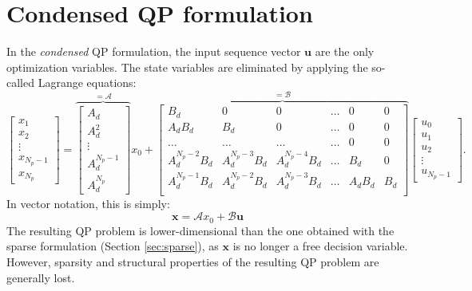 \documentclass[a4paper,12pt,fleqn]{article}
\newcommand{\varxvec}{\mathbf{x}}
\newcommand{\varuvec}{\mathbf{u}}
\newcommand{\Np}{{N_p}}
\begin{document}
\section{Condensed QP formulation}
In the \emph{condensed} QP formulation, the input sequence vector $\varuvec$ are the only optimization variables. The state variables are eliminated by applying the so-called Lagrange equations:
\begin{equation}
\begin{bmatrix}
x_1\\
x_2\\
\vdots\\
x_{\Np-1}\\
x_{\Np}
\end{bmatrix}=
\overbrace{
\begin{bmatrix}
A_d\\
A_d^2\\
\vdots\\
A_d^{\Np-1}\\
A_d^\Np
\end{bmatrix}
}^{=\mathcal{A}}
x_0 + 
\overbrace{
\begin{bmatrix}
 B_d                &0              &0              &\dots      &0      &0\\
 A_dB_d               &B_d            &0              &\dots      &0      &0\\
 \dots              &\dots          &\dots          &\dots     &0       &0\\
 A_d^{\Np-2}B_d       &A_d^{\Np-3}B_d   &A_d^{\Np-4}B_d   &\dots     &B_d       &0\\
 A_d^{\Np-1}B_d       &A_d^{\Np-2}B_d   &A_d^{\Np-3}B_d   &\dots     &A_dB_d      &B_d \\
\end{bmatrix}
}^{=\mathcal B}
\begin{bmatrix}
u_0\\
u_1\\
u_2\\
\vdots\\
u_{\Np-1}
\end{bmatrix}.
\end{equation}
In vector notation, this is simply:
\begin{equation}
 \varxvec = \mathcal{A}x_0 + \mathcal{B} \varuvec
\end{equation}
The resulting QP problem is lower-dimensional than the one obtained with the sparse formulation (Section \ref{sec:sparse}), as $\varxvec$ is no longer a free decision variable. However, sparsity and structural properties of the resulting QP problem are generally lost. 
\end{document}
